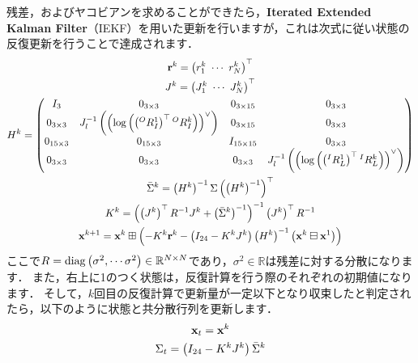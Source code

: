 残差，およびヤコビアンを求めることができたら，{\bf Iterated Extended Kalman Filter}（IEKF）を用いた更新を行いますが，これは次式に従い状態の反復更新を行うことで達成されます．
%
\begin{align}
  \begin{gathered}
    {\bf r}^{k} = \left( r_{1}^{k} ~ \cdots ~ r_{N}^{k} \right)^{\top} \\
%
    J^{k} = \left( J_{1}^{k} ~ \cdots ~ J_{N}^{k} \right)^{\top} \\
%
    H^{k} = \left( \begin{matrix}
      I_{3} & 0_{3 \times 3} & 0_{3 \times 15} & 0_{3 \times 3} \\
%
      0_{3 \times 3} & J_{l}^{-1} \left( \left( \log \left( \left( {}^{O}R_{I}^{1} \right)^{\top} {}^{O}R_{I}^{k} \right) \right)^{\vee} \right) & 0_{3 \times 15} & 0_{3 \times 3} \\
%
      0_{15 \times 3} & 0_{15 \times 3} & I_{15 \times 15} & 0_{3 \times 3} \\
%
      0_{3 \times 3} & 0_{3 \times 3} & 0_{3 \times 3} & J_{l}^{-1} \left( \left( \log \left( \left( {}^{I}R_{L}^{1} \right)^{\top} {}^{I}R_{L}^{k} \right) \right)^{\vee} \right)
    \end{matrix} \right) \\
%
    \bar{ \Sigma }^{k} = \left( H^{k} \right)^{-1} \Sigma \left( \left( H^{k} \right)^{-1} \right)^{\top} \\
%
    K^{k} = \left( \left( J^{k} \right)^{\top} R^{-1} J^{k} + \left( \bar{ \Sigma }^{k} \right)^{-1} \right)^{-1} \left( J^{k} \right)^{\top} R^{-1} \\
%
    {\bf x}^{k+1} = {\bf x}^{k} \boxplus \left( -K^{k} {\bf r}^{k} - \left( I_{24} - K^{k} J^{k} \right) \left( H^{k} \right)^{-1} \left( {\bf x}^{k} \boxminus {\bf x}^{1} \right) \right)
  \end{gathered}
  \label{eq:iterated_extended_kalman_filter}
\end{align}
%
ここで$R = {\rm diag} \left( \sigma^{2}, \cdots \sigma^{2} \right) \in \mathbb{R}^{N \times N}$であり，$\sigma^{2} \in \mathbb{R}$は残差に対する分散になります．
また，右上に1のつく状態は，反復計算を行う際のそれぞれの初期値になります．
そして，$k$回目の反復計算で更新量が一定以下となり収束したと判定されたら，以下のように状態と共分散行列を更新します．
%
\begin{align}
  \begin{gathered}
    {\bf x}_{t} = {\bf x}^{k} \\
%
    \Sigma_{t} = \left( I_{24} - K^{k} J^{k} \right) \bar{ \Sigma }^{k}
  \end{gathered}
\end{align}























